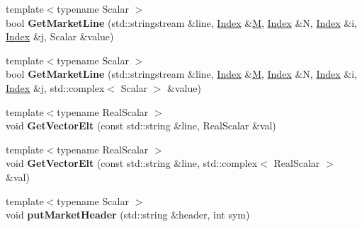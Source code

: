 \begin{DoxyCompactItemize}
\mbox{\label{namespace_eigen_1_1internal_ad15f2fb8b3837de377d2eef6243fb523}} 
{\footnotesize template$<$typename Scalar $>$ }\\bool {\bfseries Get\+Market\+Line} (std\+::stringstream \&line, \hyperlink{namespace_eigen_a62e77e0933482dafde8fe197d9a2cfde}{Index} \&\hyperlink{group___core___module_class_eigen_1_1_matrix}{M}, \hyperlink{namespace_eigen_a62e77e0933482dafde8fe197d9a2cfde}{Index} \&N, \hyperlink{namespace_eigen_a62e77e0933482dafde8fe197d9a2cfde}{Index} \&i, \hyperlink{namespace_eigen_a62e77e0933482dafde8fe197d9a2cfde}{Index} \&j, Scalar \&value)
\item 
\mbox{\label{namespace_eigen_1_1internal_aef757be9f004fbf69f93aa1bcf2343ac}} 
{\footnotesize template$<$typename Scalar $>$ }\\bool {\bfseries Get\+Market\+Line} (std\+::stringstream \&line, \hyperlink{namespace_eigen_a62e77e0933482dafde8fe197d9a2cfde}{Index} \&\hyperlink{group___core___module_class_eigen_1_1_matrix}{M}, \hyperlink{namespace_eigen_a62e77e0933482dafde8fe197d9a2cfde}{Index} \&N, \hyperlink{namespace_eigen_a62e77e0933482dafde8fe197d9a2cfde}{Index} \&i, \hyperlink{namespace_eigen_a62e77e0933482dafde8fe197d9a2cfde}{Index} \&j, std\+::complex$<$ Scalar $>$ \&value)
\item 
\mbox{\label{namespace_eigen_1_1internal_aa17f2e52fbfff17514d7539272af985b}} 
{\footnotesize template$<$typename Real\+Scalar $>$ }\\void {\bfseries Get\+Vector\+Elt} (const std\+::string \&line, Real\+Scalar \&val)
\item 
\mbox{\label{namespace_eigen_1_1internal_ad54520cf6e59094347485ae12d251b0b}} 
{\footnotesize template$<$typename Real\+Scalar $>$ }\\void {\bfseries Get\+Vector\+Elt} (const std\+::string \&line, std\+::complex$<$ Real\+Scalar $>$ \&val)
\item 
\mbox{\label{namespace_eigen_1_1internal_a07de4b2f7e69c49f64526d949633b815}} 
{\footnotesize template$<$typename Scalar $>$ }\\void {\bfseries put\+Market\+Header} (std\+::string \&header, int sym)
\item 

\end{DoxyCompactItemize}
